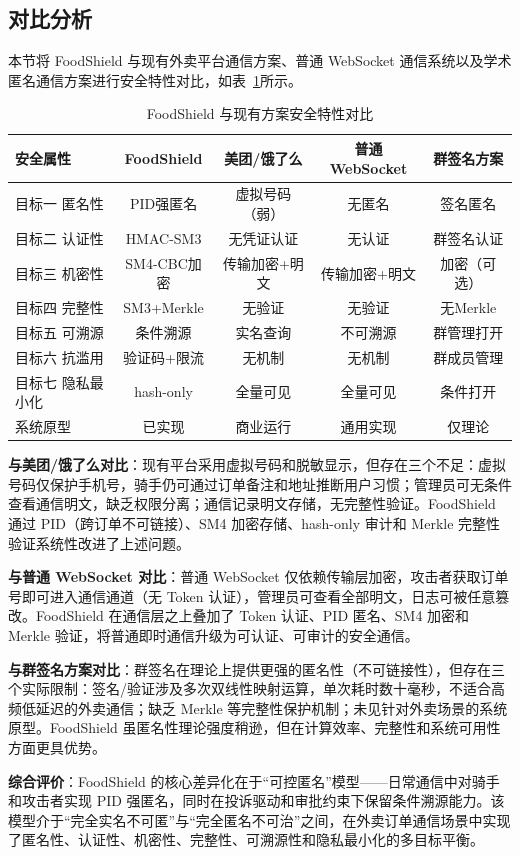 \subsection{对比分析}

本节将 FoodShield 与现有外卖平台通信方案、普通 WebSocket 通信系统以及学术匿名通信方案进行安全特性对比，如表~\ref{tab:compare}所示。

\begin{table}[H]
\centering
\caption{FoodShield 与现有方案安全特性对比}
\label{tab:compare}
\footnotesize
\setlength{\tabcolsep}{3pt}
\begin{tabular}{lcccc}
\hline
\textbf{安全属性} & \textbf{FoodShield} & \textbf{美团/饿了么} & \textbf{普通WebSocket} & \textbf{群签名方案} \\
\hline
目标一 匿名性 & PID强匿名 & 虚拟号码（弱） & 无匿名 & 签名匿名 \\
目标二 认证性 & HMAC-SM3 & 无凭证认证 & 无认证 & 群签名认证 \\
目标三 机密性 & SM4-CBC加密 & 传输加密+明文 & 传输加密+明文 & 加密（可选） \\
目标四 完整性 & SM3+Merkle & 无验证 & 无验证 & 无Merkle \\
目标五 可溯源 & 条件溯源 & 实名查询 & 不可溯源 & 群管理打开 \\
目标六 抗滥用 & 验证码+限流 & 无机制 & 无机制 & 群成员管理 \\
目标七 隐私最小化 & hash-only & 全量可见 & 全量可见 & 条件打开 \\
系统原型 & 已实现 & 商业运行 & 通用实现 & 仅理论 \\
\hline
\end{tabular}
\end{table}

\textbf{与美团/饿了么对比}：现有平台采用虚拟号码和脱敏显示，但存在三个不足：虚拟号码仅保护手机号，骑手仍可通过订单备注和地址推断用户习惯；管理员可无条件查看通信明文，缺乏权限分离；通信记录明文存储，无完整性验证。FoodShield 通过 PID（跨订单不可链接）、SM4 加密存储、hash-only 审计和 Merkle 完整性验证系统性改进了上述问题。

\textbf{与普通 WebSocket 对比}：普通 WebSocket 仅依赖传输层加密，攻击者获取订单号即可进入通信通道（无 Token 认证），管理员可查看全部明文，日志可被任意篡改。FoodShield 在通信层之上叠加了 Token 认证、PID 匿名、SM4 加密和 Merkle 验证，将普通即时通信升级为可认证、可审计的安全通信。

\textbf{与群签名方案对比}：群签名在理论上提供更强的匿名性（不可链接性），但存在三个实际限制：签名/验证涉及多次双线性映射运算，单次耗时数十毫秒，不适合高频低延迟的外卖通信；缺乏 Merkle 等完整性保护机制；未见针对外卖场景的系统原型。FoodShield 虽匿名性理论强度稍逊，但在计算效率、完整性和系统可用性方面更具优势。

\textbf{综合评价}：FoodShield 的核心差异化在于“可控匿名”模型——日常通信中对骑手和攻击者实现 PID 强匿名，同时在投诉驱动和审批约束下保留条件溯源能力。该模型介于“完全实名不可匿”与“完全匿名不可治”之间，在外卖订单通信场景中实现了匿名性、认证性、机密性、完整性、可溯源性和隐私最小化的多目标平衡。
